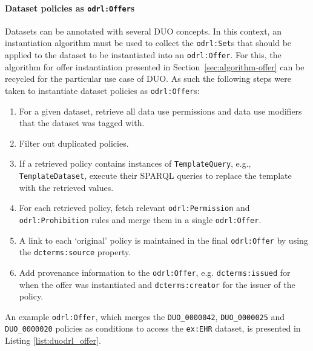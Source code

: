 \paragraph{Dataset policies as \texttt{odrl:Offer}s}
Datasets can be annotated with several DUO concepts.
In this context, an instantiation algorithm must be used to collect the \texttt{odrl:Set}s that should be applied to the dataset to be instantiated into an \texttt{odrl:Offer}.
For this, the algorithm for offer instantiation presented in Section~\ref{sec:algorithm-offer} can be recycled for the particular use case of DUO.
As such the following steps were taken to instantiate dataset policies as \texttt{odrl:Offer}s:
\begin{enumerate}
    \item For a given dataset, retrieve all data use permissions and data use modifiers that the dataset was tagged with.
    \item Filter out duplicated policies.
    \item If a retrieved policy contains instances of \texttt{TemplateQuery}, e.g., \texttt{TemplateDataset}, execute their SPARQL queries to replace the template with the retrieved values.
    \item For each retrieved policy, fetch relevant \texttt{odrl:Permission} and \texttt{odrl:Prohibition} rules and merge them in a single \texttt{odrl:Offer}.
    \item A link to each `original' policy is maintained in the final \texttt{odrl:Offer} by using the \texttt{dcterms:source} property.
    \item Add provenance information to the \texttt{odrl:Offer}, e.g. \texttt{dcterms:issued} for when the offer was instantiated and \texttt{dcterms:creator} for the issuer of the policy.
\end{enumerate}

An example \texttt{odrl:Offer}, which merges the \texttt{DUO\_0000042}, \texttt{DUO\_0000025} and \texttt{DUO\_0000020} policies as conditions to access the \texttt{ex:EHR} dataset, is presented in Listing \ref{list:duodrl_offer}.

